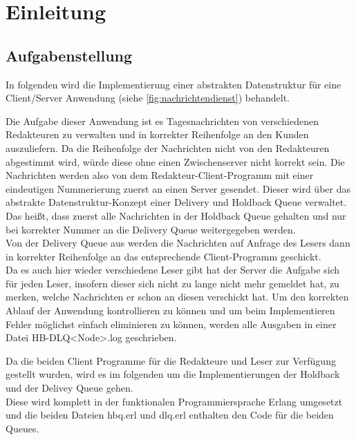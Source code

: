 \section{Einleitung}

\subsection{Aufgabenstellung}

In folgenden wird die Implementierung einer abstrakten Datenstruktur für eine Client/Server Anwendung (siehe \ref{fig:nachrichtendienst}) behandelt. 

Die Aufgabe dieser Anwendung ist es Tagesnachrichten von verschiedenen Redakteuren zu verwalten und in korrekter Reihenfolge an den Kunden auszuliefern. Da die Reihenfolge der Nachrichten nicht von den Redakteuren abgestimmt wird, würde diese ohne einen Zwischenserver nicht korrekt sein. Die Nachrichten werden also von dem Redakteur-Client-Programm mit einer eindeutigen Nummerierung zuerst an einen Server gesendet. Dieser wird über das abstrakte Datenstruktur-Konzept einer Delivery und Holdback Queue verwaltet. Das heißt, dass zuerst alle Nachrichten in der Holdback Queue gehalten und nur bei korrekter Nummer an die Delivery Queue weitergegeben werden.\\ 
Von der Delivery Queue aus werden die Nachrichten auf Anfrage des Lesers dann in korrekter Reihenfolge an das entsprechende Client-Programm geschickt.\\
Da es auch hier wieder verschiedene Leser gibt hat der Server die Aufgabe sich für jeden Leser, insofern dieser sich nicht zu lange nicht mehr gemeldet hat, zu merken, welche Nachrichten er schon an diesen verschickt hat. 
Um den korrekten Ablauf der Anwendung kontrollieren zu können und um beim Implementieren Fehler möglichst einfach eliminieren zu können, werden alle Ausgaben in einer Datei HB-DLQ<Node>.log geschrieben.

Da die beiden Client Programme für die Redakteure und Leser zur Verfügung gestellt wurden, wird es im folgenden um die Implementierungen der Holdback und der Delivey Queue gehen.\\ 
Diese wird komplett in der funktionalen Programmiersprache Erlang umgesetzt und die beiden Dateien hbq.erl und dlq.erl enthalten den Code für die beiden Queues.  

